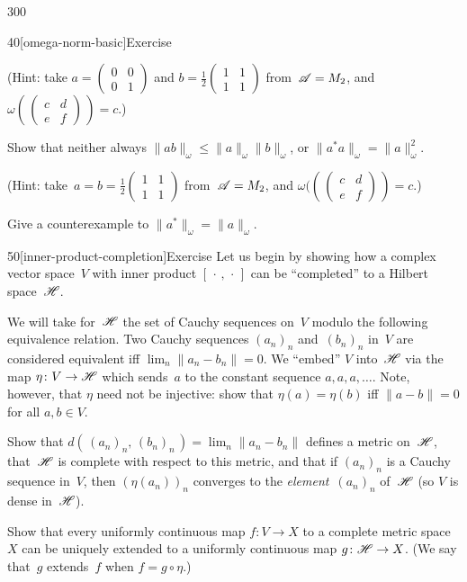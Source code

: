 \begin{parsec}{300}
\begin{point}{40}[omega-norm-basic]{Exercise}
\begin{enumerate}
(Hint:
take $a=(\begin{smallmatrix}0&0\\0&1\end{smallmatrix})$
and $b=\frac{1}{2}(\begin{smallmatrix}1&1\\1&1\end{smallmatrix})$
from~$\mathscr{A}=M_2$,
and $\omega(\,(\begin{smallmatrix}c & d\\e&f\end{smallmatrix})\,)=c$.)

Show that neither always
$\|ab\|_\omega \leq \|a\|_\omega \|b\|_\omega$,
or
$\|a^*a\|_\omega = \|a\|^2_\omega$.

(Hint: 
take~$a=b=\frac{1}{2}(\begin{smallmatrix}1 & 1 \\ 1 & 1\end{smallmatrix})$
from~$\mathscr{A}= M_2$,
and 
$\omega((\,(\begin{smallmatrix}c&d\\e&f\end{smallmatrix})\,)=c$.)

Give a counterexample to $\|a^*\|_\omega = \|a\|_\omega$.
\end{enumerate}
\end{point}
\begin{point}{50}[inner-product-completion]{Exercise}%
Let us begin by showing how a complex vector space~$V$
with inner product
$[\,\cdot\,,\,\cdot\,]$ can be ``completed'' to a Hilbert space~$\mathscr{H}$.

We will take for~$\mathscr{H}$ the set of Cauchy sequences on~$V$
modulo the following equivalence relation.
Two Cauchy sequences $(a_n)_n$ and~$(b_n)_n$ in~$V$
are considered equivalent
iff $\lim_n \|a_n-b_n\|=0$.
We ``embed'' $V$ into~$\mathscr{H}$ via the map $\eta\colon V\to \mathscr{H}$
which sends~$a$ to
the constant sequence $a,a,a,\dotsc$.
Note, however, that $\eta$ need not be injective:
show that $\eta(a)=\eta(b)$ iff $\|a-b\|=0$ for all $a,b\in V$.

Show that $d(\,(a_n)_n,\,(b_n)_n\,) = \lim_n \|a_n-b_n\|$
defines a metric on~$\mathscr{H}$,
that~$\mathscr{H}$ is complete with respect to this metric,
and that if $(a_n)_n$ is a Cauchy sequence in~$V$,
then $(\eta(a_n))_n$ converges to the \emph{element}~$(a_n)_n$ of~$\mathscr{H}$
(so $V$ is dense in~$\mathscr{H}$).

Show that every uniformly continuous 
map $f\colon V\to X$ to a complete metric space~$X$
can be uniquely extended to a uniformly continuous map $g\colon \mathscr{H}\to X$.
(We say that~$g$ extends~$f$ when $f=g\circ \eta$.)


\end{point}
\end{parsec}
